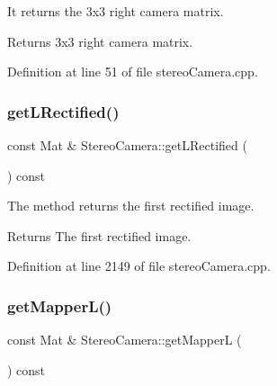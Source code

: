 It returns the 3x3 right camera matrix. 

\begin{DoxyReturn}{Returns}
3x3 right camera matrix. 
\end{DoxyReturn}


Definition at line 51 of file stereo\+Camera.\+cpp.


\begin{DoxyCode}{0}

\end{DoxyCode}
\mbox{\label{classStereoCamera_ad81c9f7f4f15ef3f1e61d34fd8df9856}} 
\subsubsection{\texorpdfstring{getLRectified()}{getLRectified()}}
{\footnotesize\ttfamily const Mat \& Stereo\+Camera\+::get\+L\+Rectified (\begin{DoxyParamCaption}{ }\end{DoxyParamCaption}) const}



The method returns the first rectified image. 

\begin{DoxyReturn}{Returns}
The first rectified image. 
\end{DoxyReturn}


Definition at line 2149 of file stereo\+Camera.\+cpp.


\begin{DoxyCode}{0}

\end{DoxyCode}
\mbox{\label{classStereoCamera_ae1c7ef2cc1a3de5d10c6bb39fbb78719}} 
\subsubsection{\texorpdfstring{getMapperL()}{getMapperL()}}
{\footnotesize\ttfamily const Mat \& Stereo\+Camera\+::get\+MapperL (\begin{DoxyParamCaption}{ }\end{DoxyParamCaption}) const}



